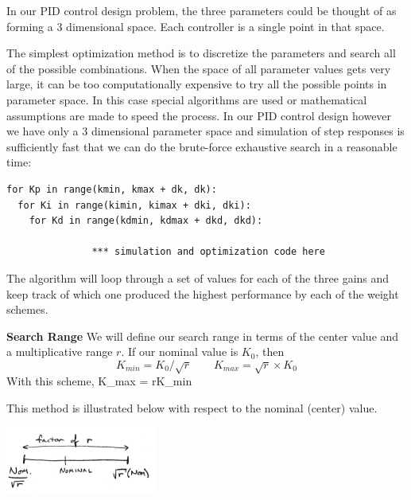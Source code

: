 


In our PID control design problem, the three parameters could be thought of as forming a 3 dimensional space.  Each controller is a single point in that space.

The simplest optimization method is to discretize the parameters and search all of the possible combinations.
When the space of all parameter values gets very large, it can be too computationally expensive to try all the possible points in parameter space.  In this case special algorithms are used or mathematical assumptions are made to speed the process.
In our PID control design however we have only a 3 dimensional parameter space and simulation of step responses is sufficiently fast that we can do the brute-force exhaustive search in a reasonable time:


\begin{verbatim}
for Kp in range(kmin, kmax + dk, dk):
  for Ki in range(kimin, kimax + dki, dki):
    for Kd in range(kdmin, kdmax + dkd, dkd):

               *** simulation and optimization code here

\end{verbatim}






The algorithm will loop through a set of values for each of the three gains and keep track of which one produced the highest performance by each of the weight schemes.

{\bf Search Range}  We will define our search range in terms of the center value and a multiplicative range $r$. If our nominal value is $K_0$, then
\[
K_{min} = K_0/\sqrt{r} \qquad  K_{max} = \sqrt{r}\times K_0
\]
  With this scheme,
\bq\label{ranger}
K_{max} = rK_{min}
\eq


This method is illustrated below with respect to the nominal (center) value.	%
\begin{center}
\includegraphics[width=50mm]{figs11/00615a.png}
\end{center}

